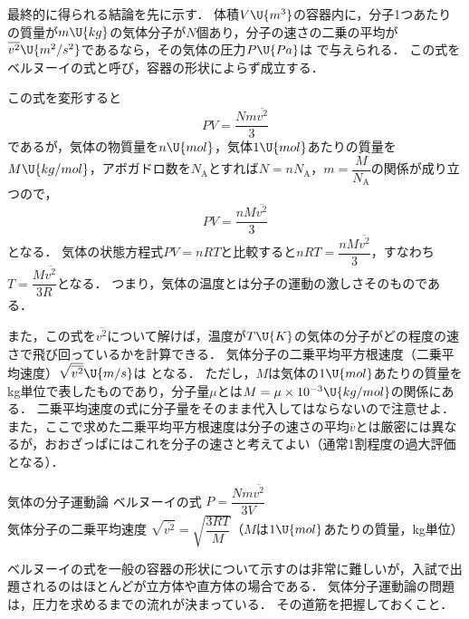 最終的に得られる結論を先に示す．
体積$V\U{m^3}$の容器内に，分子1つあたりの質量が$m\U{kg}$の気体分子が$N$個あり，分子の速さの二乗の平均が$\overline{v^2}\U{m^2/s^2}$であるなら，その気体の圧力$P\U{Pa}$は
で与えられる．
この式を{\gtfamily ベルヌーイの式}と呼び，容器の形状によらず成立する．

この式を変形すると
\[P V=\frac{Nm\overline{v^2}}{3}\]
であるが，気体の物質量を$n\U{mol}$，気体$1\U{mol}$あたりの質量を$M\U{kg/mol}$，アボガドロ数を$N_{\mathrm{A}}$とすれば$N=nN_{\mathrm{A}}$，$m=\dfrac{M}{N_{\mathrm{A}}}$の関係が成り立つので，
\[ PV=\frac{nM\overline{v^2}}{3}\]
となる．
気体の状態方程式$PV=nRT$と比較すると$nRT=\dfrac{nM\overline{v^2}}{3}$，すなわち$T=\dfrac{M\overline{v^2}}{3R}$となる．
つまり，{\gtfamily 気体の温度とは分子の運動の激しさそのものである．}

また，この式を$\overline{v^2}$について解けば，温度が$T\U{K}$の気体の分子がどの程度の速さで飛び回っているかを計算できる．
気体分子の二乗平均平方根速度（二乗平均速度）$\sqrt{\overline{v^2}}\U{m/s}$は
となる．
ただし，$M$は気体の$1\U{mol}$あたりの質量を{\gtfamily kg単位}で表したものであり，分子量$\mu$とは$M=\mu\times 10^{-3}\U{kg/mol}$の関係にある．
{\gtfamily 二乗平均速度の式に分子量をそのまま代入してはならない}ので注意せよ．
また，ここで求めた二乗平均平方根速度は分子の速さの平均$\overline{v}$とは厳密には異なるが，おおざっぱにはこれを分子の速さと考えてよい（通常1割程度の過大評価となる）．

\begin{matome}{気体の分子運動論}
 \hspace{3mm} ベルヌーイの式\hspace{23mm} $P=\dfrac{Nm\overline{v^2}}{3V}$\\
 \hspace{3mm} 気体分子の二乗平均速度\hspace{10mm} $\sqrt{\overline{v^2}}=\sqrt{\dfrac{3RT}{M}}$\hspace{6mm}（$M$は$1\U{mol}$あたりの質量，{\gtfamily kg単位}）
\end{matome}

ベルヌーイの式を一般の容器の形状について示すのは非常に難しいが，入試で出題されるのはほとんどが立方体や直方体の場合である．
気体分子運動論の問題は，圧力を求めるまでの流れが決まっている．
その道筋を把握しておくこと．

